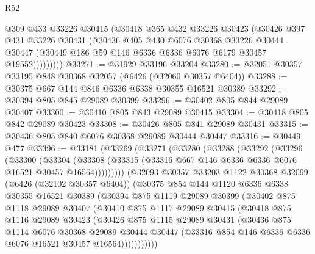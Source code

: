 \begin{lexlean}{R52}
\begin{coremodule}
              @309
              @433
              @33226
              @30415
              (@30418
                @365
                @432
                @33226
                @30423
                (@30426
                  @397
                  @431
                  @33226
                  @30431
                  (@30436
                    @405
                    @430
                    @6076
                    @30368
                    @33226
                    @30444
                    @30447
                    (@30449 @186 @59 @146 @6336 @6336 @6076 @6179 @30457 @19552)))))))))
@33271 := @31929 @33196 @33204
@33280 := @32051 @30357 @33195 @848 @30368 @32057 (@6426 (@32060 @30357 @6404))
@33288 := @30375 @667 @144 @846 @6336 @6338 @30355 @16521 @30389
@33292 := @30394 @805 @845 @29089 @30399
@33296 := @30402 @805 @844 @29089 @30407
@33300 := @30410 @805 @843 @29089 @30415
@33304 := @30418 @805 @842 @29089 @30423
@33308 := @30426 @805 @841 @29089 @30431
@33315 := @30436 @805 @840 @6076 @30368 @29089 @30444 @30447
@33316 := @30449 @477
@33396 := @33181
    (@33269
      (@33271
        (@33280
          (@33288
            (@33292
              (@33296
                (@33300
                  (@33304
                    (@33308
                      (@33315 (@33316 @667 @146 @6336 @6336 @6076 @16521 @30457 @16564)))))))))
        (@32093
          @30357
          @33203
          @1122
          @30368
          @32099
          (@6426 (@32102 @30357 @6404))
          (@30375
            @854
            @144
            @1120
            @6336
            @6338
            @30355
            @16521
            @30389
            (@30394
              @875
              @1119
              @29089
              @30399
              (@30402
                @875
                @1118
                @29089
                @30407
                (@30410
                  @875
                  @1117
                  @29089
                  @30415
                  (@30418
                    @875
                    @1116
                    @29089
                    @30423
                    (@30426
                      @875
                      @1115
                      @29089
                      @30431
                      (@30436
                        @875
                        @1114
                        @6076
                        @30368
                        @29089
                        @30444
                        @30447
                        (@33316 @854 @146 @6336 @6336 @6076 @16521 @30457 @16564)))))))))))

\end{coremodule}
\end{lexlean}
